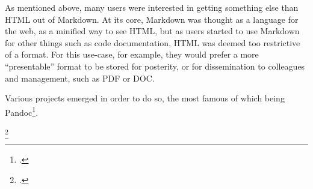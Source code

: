 As mentioned above, many users were interested in getting something else than HTML out of Markdown. At its core, Markdown was thought as
a language for the web, as a minified way to see HTML, but as users started to use Markdown for other things such as code documentation,
HTML was deemed too restrictive of a format. For this use-case, for example, they would prefer a more ``presentable'' format to be stored
for posterity, or for dissemination to colleagues and management, such as PDF or DOC.\newline

Various projects emerged in order to do so, the most famous of which being Pandoc\footcite{pandoc}.

\footcite{dominici2014overview}